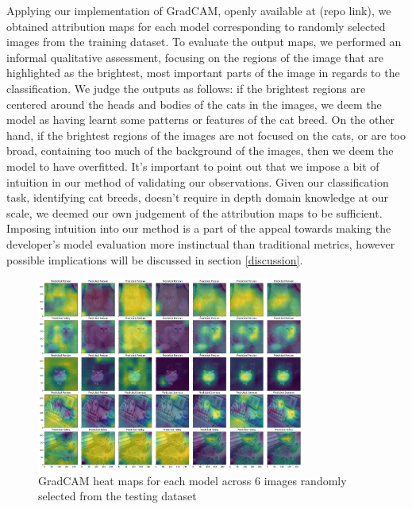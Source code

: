\documentclass[conference]{IEEEtran}
\begin{document}
Applying our implementation of GradCAM, openly available at (repo link), we obtained attribution maps for each model corresponding to randomly selected images from the training dataset.
To evaluate the output maps, we performed an informal qualitative assessment, focusing on the regions of the image that are highlighted as the brightest, most important parts of the image in regards to the classification. We judge the outputs as follows: if the brightest regions are centered around the heads and bodies of the cats in the images, we deem the model as having learnt some patterns or features of the cat breed. On the other hand, if the brightest regions of the images are not focused on the cats, or are too broad, containing too much of the background of the images, then we deem the model to have overfitted. It's important to point out that we impose a bit of intuition in our method of validating our observations. Given our classification task, identifying cat breeds, doesn't require in depth domain knowledge at our scale, we deemed our own judgement of the attribution maps to be sufficient. Imposing intuition into our method is a part of the appeal towards making the developer's model evaluation more instinctual than traditional metrics, however possible implications will be discussed in section \ref{discussion}. 

\begin{figure} [h]
    \centering
    \includegraphics[height=2.5in]{imgs/cat_grids/1.png}
    \caption{GradCAM heat maps for each model across 6 images randomly selected from the testing dataset}
    \label{fig:1}
\end{figure}
\end{document}
